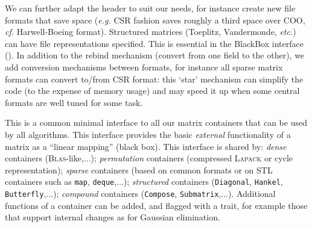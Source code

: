 \documentclass[a4paper]{article}
\def\textsf#1{{\biolinum #1}}
\def\scsf#1{{\scshape \biolinum #1}} %
\def\ldots{...}
\newcommand\applin{\textsf{BlackBox}\xspace}
\newcommand{\cf}{\mbox{\emph{cf.}}\xspace}
\newcommand{\eg}{\mbox{\emph{e.g.}}\xspace}
\newcommand{\etc}{\mbox{\emph{etc.}}\xspace}
\newcommand{\blas}{\scsf{Blas}\xspace}
\begin{document}
		We can further adapt the header to suit our needs, for instance
		create new file formats that save space (\eg CSR fashion saves
		roughly a third space over COO, \cf Harwell-Boeing format).
		Structured matrices (Toeplitz, Vandermonde, \etc) can have file
		representations specified.
%
%
		This is essential in the \applin interface ().
%
		In addition to the rebind mechanism (convert from one field to the other), we add
%
	 conversion mechanisms between formats, for instance all
	 sparse matrix formats can convert to/from CSR format:  this `star'
	 mechanism can simplify the code (to the expense of memory usage) and
	 may speed it up when some central formats  are
	 well tuned for some task.
%
	 \par
%
This is a common minimal interface to all our matrix containers that can be
used by all algorithms.
This interface provides the basic {\em external}
functionality of a matrix as a
 ``linear mapping'' (black box).
This interface is shared by: \emph{dense}
containers (\blas-like,\ldots); \emph{permutation} containers (compressed
\scsf{Lapack} or cycle representation); \emph{sparse} containers (based on
common formats or on STL containers such as {\tt map}, {\tt deque},\ldots);
\emph{structured} containers ({\tt Diagonal}, {\tt Hankel}, {\tt Butterfly},\ldots);
\emph{compound} containers ({\tt Compose}, {\tt Submatrix},\ldots).
Additional functions of a container can be added, and flagged with a trait, for
example those that support internal changes as for Gaussian elimination.
%
\end{document}

